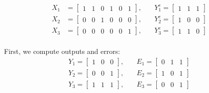 \documentclass{article}
\theoremstyle{definition}
\theoremstyle{remark}
\begin{document}
\[
    \begin{aligned}
        X_1 & = \begin{bmatrix} 1 & 1 & 0 & 1 & 0 & 1 \end{bmatrix}, \\
        X_2 & = \begin{bmatrix} 0 & 0 & 1 & 0 & 0 & 0 \end{bmatrix}, \\
        X_3 & = \begin{bmatrix} 0 & 0 & 0 & 0 & 0 & 1 \end{bmatrix}, \\
    \end{aligned}
    \quad
    \begin{aligned}
        Y^e_1 = \begin{bmatrix} 1 & 1 & 1 \end{bmatrix} \\
        Y^e_2 = \begin{bmatrix} 1 & 0 & 0 \end{bmatrix} \\
        Y^e_3 = \begin{bmatrix} 1 & 1 & 0 \end{bmatrix} \\
    \end{aligned}
\]

First, we compute outputs and errors:
\[
    \begin{aligned}
        Y_1 = \begin{bmatrix} 1 & 0 & 0 \end{bmatrix}, \\
        Y_2 = \begin{bmatrix} 0 & 0 & 1 \end{bmatrix}, \\
        Y_3 = \begin{bmatrix} 1 & 1 & 1 \end{bmatrix}, \\
    \end{aligned}
    \quad
    \begin{aligned}
        E_1 = \begin{bmatrix} 0 & 1 & 1 \end{bmatrix} \\
        E_2 = \begin{bmatrix} 1 & 0 & 1 \end{bmatrix} \\
        E_3 = \begin{bmatrix} 0 & 0 & 1 \end{bmatrix} \\
    \end{aligned}
\]
\end{document}
